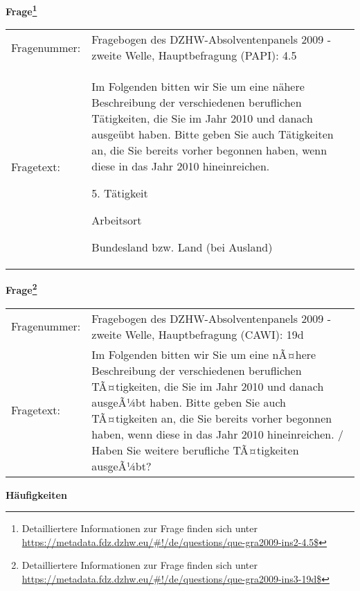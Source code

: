				\vspace*{0.5cm}
                \noindent\textbf{Frage\footnote{Detailliertere Informationen zur Frage finden sich unter
		              \url{https://metadata.fdz.dzhw.eu/\#!/de/questions/que-gra2009-ins2-4.5$}}}\\
				\begin{tabularx}{\hsize}{@{}lX}
					Fragenummer: &
					  Fragebogen des DZHW-Absolventenpanels 2009 - zweite Welle, Hauptbefragung (PAPI):
					  4.5
 \\
					Fragetext: & Im Folgenden bitten wir Sie um eine nähere Beschreibung der verschiedenen beruflichen Tätigkeiten, die Sie im Jahr 2010 und danach ausgeübt haben. Bitte geben Sie auch Tätigkeiten an, die Sie bereits vorher begonnen haben, wenn diese in das Jahr 2010 hineinreichen.\par  5. Tätigkeit\par  Arbeitsort\par  Bundesland bzw. Land (bei Ausland) \\
				\end{tabularx}
				\vspace*{0.5cm}
                \noindent\textbf{Frage\footnote{Detailliertere Informationen zur Frage finden sich unter
		              \url{https://metadata.fdz.dzhw.eu/\#!/de/questions/que-gra2009-ins3-19d$}}}\\
				\begin{tabularx}{\hsize}{@{}lX}
					Fragenummer: &
					  Fragebogen des DZHW-Absolventenpanels 2009 - zweite Welle, Hauptbefragung (CAWI):
					  19d
 \\
					Fragetext: & Im Folgenden bitten wir Sie um eine nÃ¤here Beschreibung der verschiedenen beruflichen TÃ¤tigkeiten, die Sie im Jahr 2010 und danach ausgeÃ¼bt haben. Bitte geben Sie auch TÃ¤tigkeiten an, die Sie bereits vorher begonnen haben, wenn diese in das Jahr 2010 hineinreichen. / Haben Sie weitere berufliche TÃ¤tigkeiten ausgeÃ¼bt? \\
				\end{tabularx}





        		\vspace*{0.5cm}
                \noindent\textbf{Häufigkeiten}

